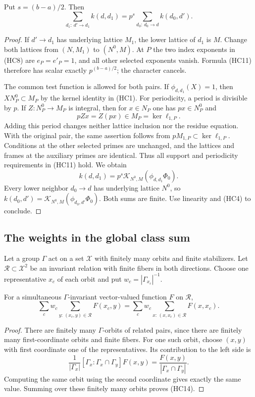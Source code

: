 \begin{theorem}\label{hec-point-identity}
Put $s=(b-a)/2$. Then
\[
 \sum_{d_1:\ d'\to d_1}k(d,d_1)
       =p^s\sum_{d_0:\ d_0\to d}k(d_0,d').
 \tag{HC13}
\]
\end{theorem}
\begin{proof}
If $d'\to d_1$ has underlying lattice $M_1$, the lower lattice
of $d_1$ is $M$. Change both lattices from $(N,M_1)$ to $(N^0,M)$.
At $P$ the two index exponents in (HC8) are $e_P=e'_P=1$,
and all other selected exponents vanish. Formula (HC11) therefore
has scalar exactly $p^{(b-a)/2}$; the character cancels.

The common test function is allowed for both pairs. If
$\phi_{d,d_1}(X)=1$, then $XN^0_P\subset M_P$ by the kernel
identity in (HC1). For periodicity, a period is divisible by $p$.
If $Z:N^0_P\to M_P$ is integral, then for $x\in N_P$ one has
$px\in N^0_P$ and
\[
                   pZx=Z(px)\in M_P=\ker\ell_{1,P}.
\]
Adding this period changes neither lattice inclusion nor the
residue equation. With the original pair, the same assertion
follows from $pM_{1,P}\subset\ker\ell_{1,P}$. Conditions at the
other selected primes are unchanged, and the lattices and frames
at the auxiliary primes are identical. Thus all support and
periodicity requirements in (HC11) hold. We obtain
\[
 k(d,d_1)=p^s\mathcal K_{N^0,M}(\phi_{d,d_1}\Phi_0).
\]
Every lower neighbor $d_0\to d$ has underlying lattice $N^0$,
so $k(d_0,d')=\mathcal K_{N^0,M}(\phi_{d_0,d'}\Phi_0)$.
Both sums are finite. Use linearity and (HC4) to conclude.
\end{proof}

\subsection{The weights in the global class sum}

Let a group $\Gamma$ act on a set $\mathscr X$ with finitely many
orbits and finite stabilizers. Let $\mathscr R\subset\mathscr X^2$
be an invariant relation with finite fibers in both directions.
Choose one representative $x_c$ of each orbit and put
$w_c=|\Gamma_{x_c}|^{-1}$.

\begin{lemma}\label{hec-incidence-mass}
For a simultaneous $\Gamma$-invariant vector-valued function $F$
on $\mathscr R$,
\[
 \sum_c w_c\sum_{y:\,(x_c,y)\in\mathscr R}F(x_c,y)
       =\sum_c w_c\sum_{x:\,(x,x_c)\in\mathscr R}F(x,x_c).
 \tag{HC14}
\]
\end{lemma}
\begin{proof}
There are finitely many $\Gamma$-orbits of related pairs, since
there are finitely many first-coordinate orbits and finite fibers.
For one such orbit, choose $(x,y)$ with first coordinate one of
the representatives. Its contribution to the left side is
\[
 \frac1{|\Gamma_x|}[\Gamma_x:\Gamma_x\cap\Gamma_y]F(x,y)
                 =\frac{F(x,y)}{|\Gamma_x\cap\Gamma_y|}.
\]
Computing the same orbit using the second coordinate gives exactly
the same value. Summing over these finitely many orbits proves (HC14).
\end{proof}

